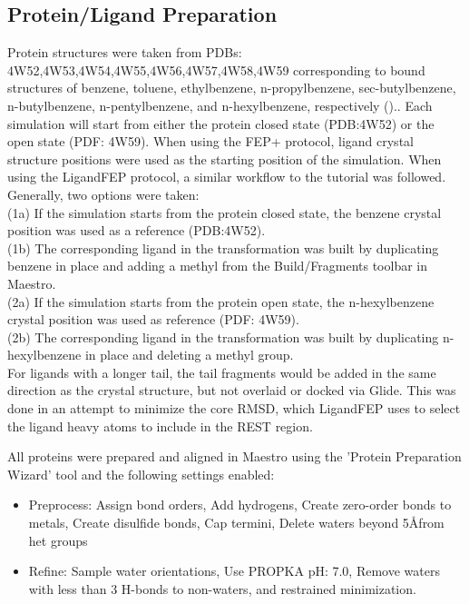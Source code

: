 \documentclass[journal=jctcce,manuscript=article]{achemso}
\begin{document}
\subsection*{Protein/Ligand Preparation}
Protein structures were taken from PDBs: 4W52,4W53,4W54,4W55,4W56,4W57,4W58,4W59 corresponding to bound structures of benzene, toluene, ethylbenzene, n-propylbenzene, sec-butylbenzene, n-butylbenzene, n-pentylbenzene, and n-hexylbenzene, respectively (\cite{Merski2015})..
Each simulation will start from either the protein closed state (PDB:4W52) or the open state (PDF: 4W59).
When using the FEP+ protocol, ligand crystal structure positions were used as the starting position of the simulation.
When using the LigandFEP protocol, a similar workflow to the tutorial \cite{LigandFEP} was followed.
Generally, two options were taken:\\
(1a) If the simulation starts from the protein closed state, the benzene crystal position was used as a reference (PDB:4W52).\\
(1b) The corresponding ligand in the transformation was built by duplicating benzene in place and adding a methyl from the Build/Fragments toolbar in Maestro\cite{Maestro}.\\
(2a) If the simulation starts from the protein open state, the n-hexylbenzene crystal position was used as reference (PDF: 4W59).\\
(2b) The corresponding ligand in the transformation was built by duplicating n-hexylbenzene in place and deleting a methyl group.\\
For ligands with a longer tail, the tail fragments would be added in the same direction as the crystal structure, but not overlaid or docked via Glide.
This was done in an attempt to minimize the core RMSD, which LigandFEP uses to select the ligand heavy atoms to include in the REST region. 

All proteins were prepared and aligned in Maestro\cite{Maestro} using the 'Protein Preparation Wizard'\cite{ProteinPrepWizSoftware,ProteinPrepWizPaper} tool and the following settings enabled:
   \begin{itemize}
   \item Preprocess: Assign bond orders, Add hydrogens, Create zero-order bonds to metals, Create disulfide bonds, Cap termini, Delete waters beyond 5\AA from het groups
   \item Refine: Sample water orientations, Use PROPKA pH: 7.0, Remove waters with less than 3 H-bonds to non-waters, and restrained minimization.
   \end{itemize}
\end{document}
